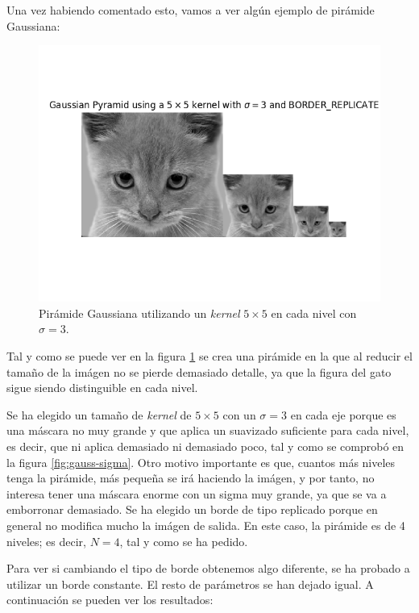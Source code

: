 \documentclass[11pt,a4paper]{article}
\begin{document}
Una vez habiendo comentado esto, vamos a ver algún ejemplo de pirámide Gaussiana:

\begin{figure}[H]
\centering
\includegraphics[scale=0.6]{img/gauss-pyr-1.png}
\caption{Pirámide Gaussiana utilizando un \textit{kernel} $5 \times 5$ en cada nivel con $\sigma = 3$.}
\label{fig:gauss-pyr-1}
\end{figure}

Tal y como se puede ver en la figura \ref{fig:gauss-pyr-1} se crea una pirámide en la que al reducir el tamaño de la
imágen no se pierde demasiado detalle, ya que la figura del gato sigue siendo distinguible en cada nivel.

Se ha elegido un tamaño de \textit{kernel} de $5 \times 5$ con un $\sigma = 3$ en cada eje porque es una máscara no
muy grande y que aplica un suavizado suficiente para cada nivel, es decir, que ni aplica demasiado ni demasiado poco, tal
y como se comprobó en la figura \ref{fig:gauss-sigma}. Otro motivo importante es que, cuantos más niveles tenga la pirámide,
más pequeña se irá haciendo la imágen, y por tanto, no interesa tener una máscara enorme con un sigma muy grande, ya que se
va a emborronar demasiado. Se ha elegido un borde de tipo replicado porque en general no modifica mucho la imágen de salida.
En este caso, la pirámide es de 4 niveles; es decir, $N=4$, tal y como se ha pedido.

Para ver si cambiando el tipo de borde obtenemos algo diferente, se ha probado a utilizar un borde constante.
El resto de parámetros se han dejado igual. A continuación se pueden ver los resultados:
\end{document}

